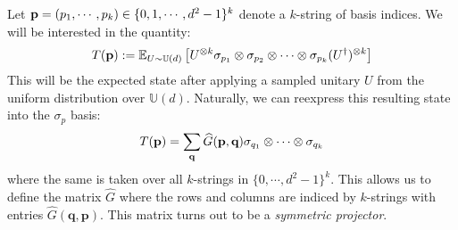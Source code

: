 \documentclass[12pt]{amsart}
\theoremstyle{definition}
\theoremstyle{remark}
\numberwithin{equation}{section}
\theoremstyle{remark}
\begin{document}
\noindent Let ${\bf p} = (p_1, \cdots, p_k) \in \{0,1,\cdots, d^2 -1\}^k$ denote a $k$-string of basis indices. We will be interested in the quantity:
%
\begin{equation}
  T({\bf p}) := \mathbb{E}_{U \sim \mathbb{U}(d)} \left[ U^{\otimes k} \sigma_{p_1} \otimes \sigma_{p_2} \otimes \cdots \otimes \sigma_{p_k} (U^\dagger)^{\otimes k} \right]
\end{equation}
This will be the expected state after applying a sampled unitary $U$ from the uniform distribution over $\mathbb{U}(d)$. Naturally, we can reexpress this resulting state into the $\sigma_p$ basis:
%
\begin{equation}
  T({\bf p}) = \sum_{{\bf q}} \widehat{G}(\textbf{p},\textbf{q}) \sigma_{q_1} \otimes \cdots \otimes \sigma_{q_k}
\end{equation}
where the same is taken over all $k$-strings in $\{0, \cdots, d^2-1\}^k$. This allows us to define the matrix $\widehat{G}$ where the rows and columns are indiced by $k$-strings with entries $\widehat{G}(\textbf{q},\textbf{p})$. This matrix turns out to be a \emph{symmetric projector}.
\end{document}
